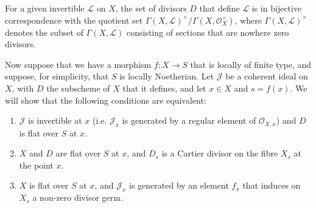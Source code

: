   For a given invertible \(\mathscr {L}\) on \(X\), the set of divisors \(D\) that define \(\mathscr {L}\) is in bijective correspondence with the quotient set \(\Gamma (X,\mathscr {L})^{\times }/\Gamma (X,\mathcal {O}_X^\times )\), where \(\Gamma (X,\mathscr {L})^\times \) denotes the subset of \(\Gamma (X,\mathscr {L})\) consisting of sections that are nowhere zero divisors.\par{}Now suppose that we have a morphism \(f\colon  X\to  S\) that is locally of finite type, and suppose, for simplicity, that \(S\) is locally Noetherian.
  Let \(\mathscr {J}\) be a coherent ideal on \(X\), with \(D\) the subscheme of \(X\) that it defines, and let \(x\in  X\) and \(s=f(x)\).
  We will show that the following conditions are equivalent:

  
 \begin{enumerate}
    
 \item[i.]
      \(\mathscr {J}\) is invertible at \(x\) (i.e. \(\mathscr {J}_x\) is generated by a regular element of \(\mathcal {O}_{X,x}\)) and \(D\) is flat over \(S\) at \(x\).
    

    
 \item[ii.]
      \(X\) and \(D\) are flat over \(S\) at \(x\), and \(D_s\) is a Cartier divisor on the fibre \(X_s\) at the point \(x\).
    

    
 \item[iii.]
      \(X\) is flat over \(S\) at \(x\), and \(\mathscr {J}_x\) is generated by an element \(f_x\) that induces on \(X_s\) a non-zero divisor germ.
    

  \end{enumerate}


